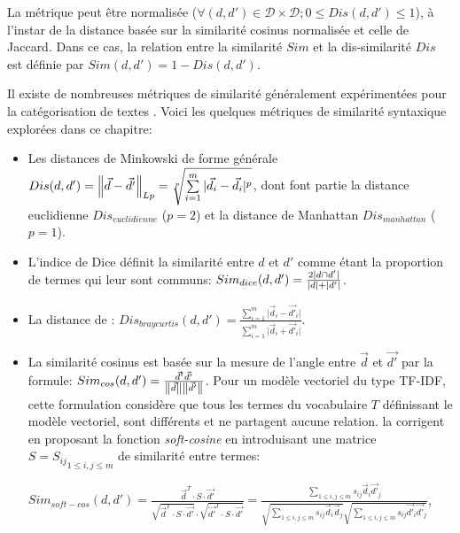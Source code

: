 La métrique peut être normalisée ($\forall (d,d') \in \mathcal{D} \times \mathcal{D};  0 \leq Dis(d,d') \leq 1$), à l'instar de la distance basée sur la similarité cosinus normalisée et celle de Jaccard. Dans ce cas, la relation entre la similarité $Sim$ et la dis-similarité $Dis$ est définie par $Sim(d,d') = 1 - Dis(d,d')$.

 Il existe de nombreuses métriques de similarité généralement expérimentées pour la catégorisation de textes \citep{huang2008similarityTextClustering, vijaymeena2016surveySim, afzali2018SimKmeans}. Voici les quelques métriques de similarité syntaxique explorées dans ce chapitre:
\begin{itemize}
	\item Les distances de Minkowski de forme générale $Dis(d,d') = \left\lVert\vec{d} - \vec{d'}\right\rVert_{Lp} = \sqrt[p]{\sum\limits_{i=1}^m \vert \vec{d}_i - \vec{d}_i \vert ^p}$, dont font partie la distance euclidienne $Dis_{euclidienne}$ ($p=2$) et la distance de Manhattan $Dis_{manhattan}$ ($p=1$).
	\item L'indice de Dice définit la similarité entre $d$ et $d'$ comme étant la proportion de termes qui leur sont communs: $Sim_{dice}(d,d') = \frac{2 {\vert d \cap d'\vert}}{{\vert d\vert} + {\vert d'\vert}}$.
	\item La distance de \citet{bray1957distance-braycurtis}: $Dis_{braycurtis}(d,d') = \frac{\sum\limits_{i=1}^m \vert \vec{d}_i - \vec{d'}_i \vert}{\sum\limits_{i=1}^m \vert \vec{d}_i + \vec{d'}_i \vert}$\citep{huang2008similarityTextClustering}.
	\item La similarité cosinus est basée sur la mesure de l'angle entre $\vec{d}$ et $\vec{d'}$ par la formule: $Sim_{cos}(d,d') = \frac{\vec{d}^t\vec{d'}}{\left\lVert\vec{d}\right\rVert\left\lVert\vec{d'}\right\rVert}$.
	Pour un modèle vectoriel du type TF-IDF, cette formulation considère que tous les termes du vocabulaire $T$ définissant le modèle vectoriel, sont différents et ne partagent aucune relation. \citet{sidorov2014softcosine} la corrigent en proposant la fonction \textit{soft-cosine} en introduisant une matrice $S = {S_{ij}}_{1\leq i,j \leq m}$ de similarité entre  termes: 
	
	$Sim_{soft-cos}(d,d')= \frac{{\vec{d}}^T\cdot S\cdot \vec{d'}}{\sqrt{{\vec{d}}^T\cdot S\cdot \vec{d'}}\cdot \sqrt{\vec{d'}^T\cdot S\cdot \vec{d'}}} = \frac{\sum\limits_{1\leq i,j \leq m}s_{ij}\vec{d}_i\vec{d'}_j}{\sqrt{\sum\limits_{1\leq i,j \leq m}s_{ij}\vec{d}_i\vec{d}_j}\sqrt{\sum\limits_{1\leq i,j \leq m}s_{ij}\vec{d'}_i\vec{d'}_j}}$,
	

\end{itemize}
